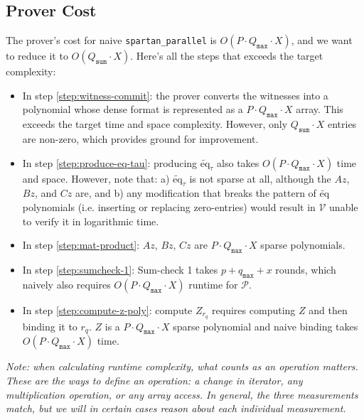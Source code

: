 \documentclass{article}
\newcommand{\code}{\texttt}
\newcommand{\Qsum}{Q_{\mathtt{sum}}}
\newcommand{\Qmax}{Q_{\mathtt{max}}}
\newcommand{\qmax}{q_{\mathtt{max}}}
\renewcommand{\P}{\mathcal{P}}
\newcommand{\V}{\mathcal{V}}
\newcommand{\eq}{\widetilde{\mbox{eq}}}
\begin{document}
\subsection{Prover Cost}
The prover's cost for naive \code{spartan\_parallel} is $O(P\cdot\Qmax\cdot X)$, and we want to reduce it to $O(\Qsum \cdot X)$. Here's all the steps that exceeds the target complexity:
\begin{itemize}
    \item In step \ref{step:witness-commit}: the prover converts the witnesses into a polynomial whose dense format is represented as a $P\cdot \Qmax \cdot X$ array. This exceeds the target time and space complexity. However, only $\Qsum \cdot X$ entries are non-zero, which provides ground for improvement.
    \item In step \ref{step:produce-eq-tau}: producing $\eq_\tau$ also takes $O(P\cdot\Qmax\cdot X)$ time and space. However, note that: a) $\eq_\tau$ is not sparse at all, although the $Az$, $Bz$, and $Cz$ are, and b) any modification that breaks the pattern of $\eq$ polynomials (i.e. inserting or replacing zero-entries) would result in $\V$ unable to verify it in logarithmic time.
    \item In step \ref{step:mat-product}: $Az$, $Bz$, $Cz$ are $P\cdot \Qmax \cdot X$ sparse polynomials.
    \item In step \ref{step:sumcheck-1}: Sum-check 1 takes $p + \qmax + x$ rounds, which naively also requires $O(P\cdot\Qmax\cdot X)$ runtime for $\P$.
    \item In step \ref{step:compute-z-poly}: compute $Z_{r_q}$ requires computing $Z$ and then binding it to $r_q$. $Z$ is a $P\cdot \Qmax \cdot X$ sparse polynomial and naive binding takes $O(P\cdot \Qmax \cdot X)$ time. 
\end{itemize}
\emph{Note: when calculating runtime complexity, what counts as an operation matters. These are the ways to define an operation: a change in iterator, any multiplication operation, or any array access. In general, the three measurements match, but we will in certain cases reason about each individual measurement.}
\end{document}
